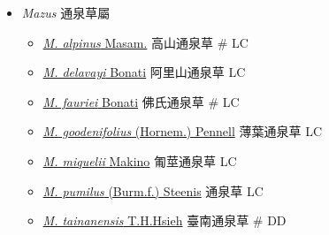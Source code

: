 
  \begin{itemize}
 \item[] \textit{Mazus} 通泉草屬
                                
  \begin{itemize}
        \item[] \href{http://www.theplantlist.org/tpl1.1/search?q=Mazus+alpinus}{\textit{M. alpinus} Masam.}   高山通泉草  \# LC
        \item[] \href{http://www.theplantlist.org/tpl1.1/search?q=Mazus+delavayi}{\textit{M. delavayi} Bonati}   阿里山通泉草   LC
        \item[] \href{http://www.theplantlist.org/tpl1.1/search?q=Mazus+fauriei}{\textit{M. fauriei} Bonati}   佛氏通泉草  \# LC
        \item[] \href{http://www.theplantlist.org/tpl1.1/search?q=Mazus+goodenifolius}{\textit{M. goodenifolius} (Hornem.) Pennell}   薄葉通泉草   LC
        \item[] \href{http://www.theplantlist.org/tpl1.1/search?q=Mazus+miquelii}{\textit{M. miquelii} Makino}   匍莖通泉草   LC
        \item[] \href{http://www.theplantlist.org/tpl1.1/search?q=Mazus+pumilus}{\textit{M. pumilus} (Burm.f.) Steenis}   通泉草   LC
        \item[] \href{http://www.theplantlist.org/tpl1.1/search?q=Mazus+tainanensis}{\textit{M. tainanensis} T.H.Hsieh}   臺南通泉草  \# DD
  \end{itemize}
  \end{itemize}
